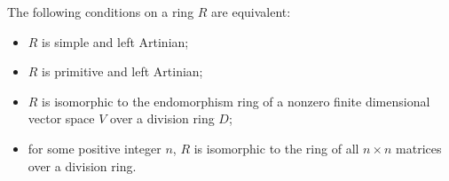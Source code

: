 The following conditions on a ring $R$ are equivalent:
\begin{itemize}
\item[(i)] $R$ is simple and left Artinian;
\item[(ii)] $R$ is primitive and left Artinian;
\item[(iii)] $R$ is isomorphic to the endomorphism ring of a nonzero finite dimensional vector space $V$ over a division ring $D$;
\item[(iv)] for some positive integer $n$, $R$ is isomorphic to the ring of all $n \times n$ matrices over a division ring.
\end{itemize}
